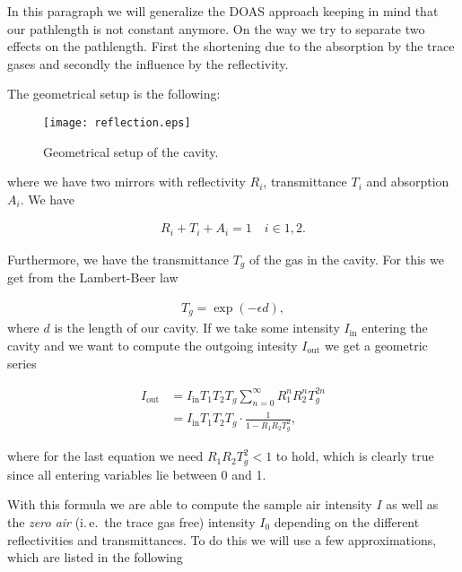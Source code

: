 In this paragraph we will generalize the DOAS approach keeping in mind
that our pathlength is not constant anymore. On the way we try to
separate two effects on the pathlength. First the shortening due to
the absorption by the trace gases and secondly the influence by the
reflectivity.

The geometrical setup is the following:

\begin{figure}[htbp]
  \centering
  \texttt{[image: reflection.eps]}
  \caption{Geometrical setup of the cavity.}
  \label{fig:cavity}
\end{figure}
where we have two mirrors with reflectivity $R_i$, transmittance $T_i$
and absorption $A_i$. We have

\begin{align*}
  R_i + T_i + A_i = 1 \quad i \in{1,2}.
\end{align*}

Furthermore, we have the transmittance $T_g$ of the gas in the
cavity. For this we get from the Lambert-Beer law

\begin{align*}
  T_g = \exp(-\epsilon d),
\end{align*}
where $d$ is the length of our cavity. If we take some intensity
$I_{\text{in}}$ entering the cavity and we want to compute the outgoing
intesity $I_{\text{out}}$ we get a geometric series

\begin{align*}
  I_{\text{out}} & = I_{\text{in}} T_1 T_2 T_g \sum_{n=0}^\infty R_1^n R_2^n T_g^{2n}\\
  & = I_{\text{in}} T_1 T_2 T_g \cdot \frac{1}{1 - R_1R_2T_g^2},
\end{align*}

where for the last equation we need $R_1R_2T_g^2 < 1$ to hold, which
is clearly true since all entering variables lie between 0 and 1.

With this formula we are able to compute the sample air intensity $I$
as well as the \emph{zero air} (i.\,e.\ the trace gas free) intensity $I_0$
depending on the different reflectivities and transmittances. To do
this we will use a few approximations, which are listed in the
following

